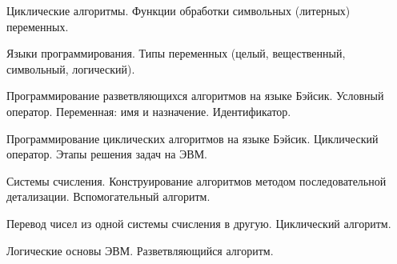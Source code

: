 \documentclass[
	14pt,
	a4paper,
	]
	{scrartcl}
\begin{document}
\vfill

\newpage


\shapk
{}
\setcounter{zad}{0}

\vfill
\z Циклические алгоритмы.
 \vfill
\z Функции обработки символьных (литерных) переменных. 
 \vfill

\vfill

\newpage


\shapk
{}
\setcounter{zad}{0}

\vfill
\z Языки программирования.
 \vfill
\z Типы переменных (целый, вещественный, символьный, логический). 
 \vfill

\vfill

\newpage


\shapk
{}
\setcounter{zad}{0}

\vfill
\z Программирование разветвляющихся алгоритмов на языке Бэйсик. Условный оператор.
 \vfill
\z Переменная: имя и назначение. Идентификатор. 
 \vfill

\vfill

\newpage


\shapk
{}
\setcounter{zad}{0}

\vfill
\z Программирование циклических алгоритмов на языке Бэйсик. Циклический оператор.
 \vfill
\z Этапы решения задач на ЭВМ. 
 \vfill

\vfill

\newpage


\shapk
{}
\setcounter{zad}{0}

\vfill
\z Системы счисления.
 \vfill
\z Конструирование алгоритмов методом последовательной детализации. Вспомогательный алгоритм. 
 \vfill

\vfill

\newpage


\shapk
{}
\setcounter{zad}{0}

\vfill
\z Перевод чисел из одной системы счисления в другую.
 \vfill
\z Циклический алгоритм. 
 \vfill

\vfill

\newpage


\shapk
{}
\setcounter{zad}{0}

\vfill
\z Логические основы ЭВМ.
 \vfill
\z Разветвляющийся алгоритм. 
 \vfill

\vfill

\newpage
\end{document}
